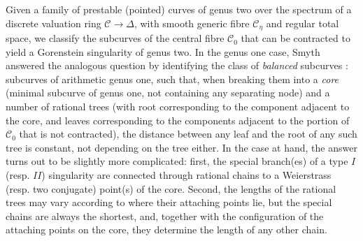 \documentclass[11pt]{amsart}
\renewcommand{\to}{\rightarrow}
\newcommand{\dvr}{\Delta}
\theoremstyle{plain}
\theoremstyle{definition}
\begin{document}
Given a family of prestable (pointed) curves of genus two over the spectrum of a discrete valuation ring $\mathcal C\to\dvr$, with smooth generic fibre $\mathcal C_{\eta}$ and regular total space, we classify the subcurves of the central fibre $\mathcal C_{0}$ that can be contracted to yield a Gorenstein singularity of genus two. In the genus one case, Smyth answered the analogous question by identifying the class of \emph{balanced} subcurves \cite[Definition 2.11]{SMY1}: subcurves of arithmetic genus one, such that, when breaking them into a \emph{core} (minimal subcurve of genus one, not containing any separating node) and a number of rational trees (with root corresponding to the component adjacent to the core, and leaves corresponding to the components adjacent to the portion of $\mathcal C_0$ that is not contracted), the distance between any leaf and the root of any such tree is constant, not depending on the tree either. In the case at hand, the answer turns out to be slightly more complicated: first, the special branch(es) of a type $I$ (resp. $I\!I$) singularity are connected through rational chains to a Weierstrass (resp. two conjugate) point(s) of the core. Second, the lengths of the rational trees may vary according to where their attaching points lie, but the special chains are always the shortest, and, together with the configuration of the attaching points on the core, they determine the length of any other chain.
\end{document}
